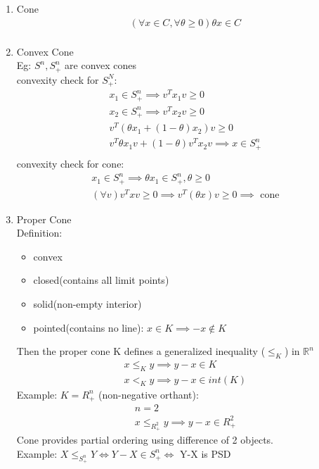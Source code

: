 \documentclass[12pt,letter]{article}
\newcommand{\R}{\mathbb{R}}
\begin{document}
\begin{enumerate}
\item Cone
  \begin{align*}
    (\forall x \in C, \forall \theta \geq 0) \theta x \in C\\
  \end{align*}
\item Convex Cone\\
  Eg: $S^n, S^n_+$ are convex cones\\
  convexity check for $S^N_+$:\\
  \begin{align*}
    x_1 \in S^n_+ \implies v^Tx_1v \geq 0\\
    x_2 \in S^n_+ \implies v^Tx_2v \geq 0\\
    v^T(\theta x_1 + (1-\theta)x_2)v \geq 0\\
    v^T\theta x_1 v + (1-\theta)v^T x_2 v \implies x \in S^n_+\\
  \end{align*}
  convexity check for cone:\\
  \begin{align*}
    x_1 \in S^n_+ \implies \theta x_1 \in S^n_+, \theta \geq 0\\
    (\forall v) v^T x v \geq 0 \implies v^T(\theta x) v \geq 0 \implies \text{ cone}
  \end{align*}
\item Proper Cone\\
  Definition:
  \begin{itemize}
  \item convex
  \item closed(contains all limit points)
  \item solid(non-empty interior)
  \item pointed(contains no line): $x \in K \implies -x \not\in K$
  \end{itemize}
  Then the proper cone K defines a generalized inequality ($\leq_K$) in $\R^n$
  \begin{align*}
    x \leq_K y \implies y-x \in K\\
    x <_K y \implies y-x \in int(K)
  \end{align*}
  Example: $K=R^n_+$ (non-negative orthant):
  \begin{align*}
    n = 2\\
    x \leq_{R^2_+} y \implies y-x \in R^2_+
  \end{align*}
  Cone provides partial ordering using difference of 2 objects.\\
  Example: $X \leq_{S^n_+} Y \iff Y-X \in S^n_+ \iff$ Y-X is PSD


\end{enumerate}
\end{document}
